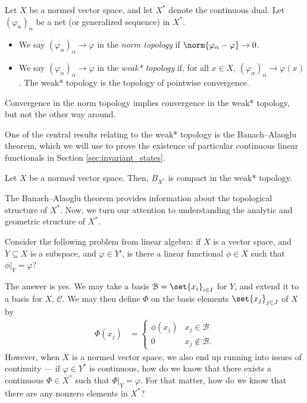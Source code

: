 \documentclass[10pt]{mypackage2}
\begin{document}
\begin{definition}
  Let $X$ be a normed vector space, and let $X^{\ast}$ denote the continuous dual. Let $\left( \varphi_{\alpha} \right)_{\alpha}$ be a net (or generalized sequence) in $X^{\ast}$.
  \begin{itemize}
    \item We say $\left( \varphi_{\alpha} \right)_{\alpha}\rightarrow \varphi$ in the \textit{norm topology} if $\norm{\varphi_{\alpha} - \varphi}\rightarrow 0$.
    \item We say $\left( \varphi_{\alpha} \right)_{\alpha}\rightarrow \varphi$ in the \textit{weak* topology} if, for all $x\in X$, $\left( \varphi_{\alpha} \right)_{\alpha}\rightarrow \varphi(x)$. The weak* topology is the topology of pointwise convergence.
  \end{itemize}
\end{definition}
\begin{remark}
  Convergence in the norm topology implies convergence in the weak* topology, but not the other way around.
\end{remark}
One of the central results relating to the weak* topology is the Banach--Alaoglu theorem, which we will use to prove the existence of particular continuous linear functionals in Section \ref{sec:invariant_states}.
\begin{theorem}\label{thm:banach_alaoglu}
  Let $X$ be a normed vector space. Then, $B_{X^{\ast}}$ is compact in the weak* topology.
\end{theorem}
The Banach--Alaoglu theorem provides information about the topological structure of $X^{\ast}$. Now, we turn our attention to understanding the analytic and geometric structure of $X^{\ast}$.\newline

Consider the following problem from linear algebra: if $X$ is a vector space, and $Y\subseteq X$ is a subspace, and $\varphi\in Y'$, is there a linear functional $\phi\in X$ such that $\phi|_{Y} = \varphi$?\newline

The answer is yes. We may take a basis $\mathcal{B} = \set{x_i}_{i\in I}$ for $Y$, and extend it to a basis for $X$, $\mathcal{C}$. We may then define $\Phi$ on the basis elements $\set{x_j}_{j\in J}$ of $X$ by
\begin{align*}
  \Phi\left( x_j \right) &= \begin{cases}
    \phi\left( x_j \right) & x_j\in \mathcal{B}\\
    0 & x_j\notin \mathcal{B}.
  \end{cases}
\end{align*}
However, when $X$ is a normed vector space, we also end up running into issues of continuity --- if $\varphi\in Y^{\ast}$ is continuous, how do we know that there exists a continuous $\Phi\in X^{\ast}$ such that $\Phi|_{Y} =\varphi$. For that matter, how do we know that there are any nonzero elements in $X^{\ast}$?\newline
\end{document}
